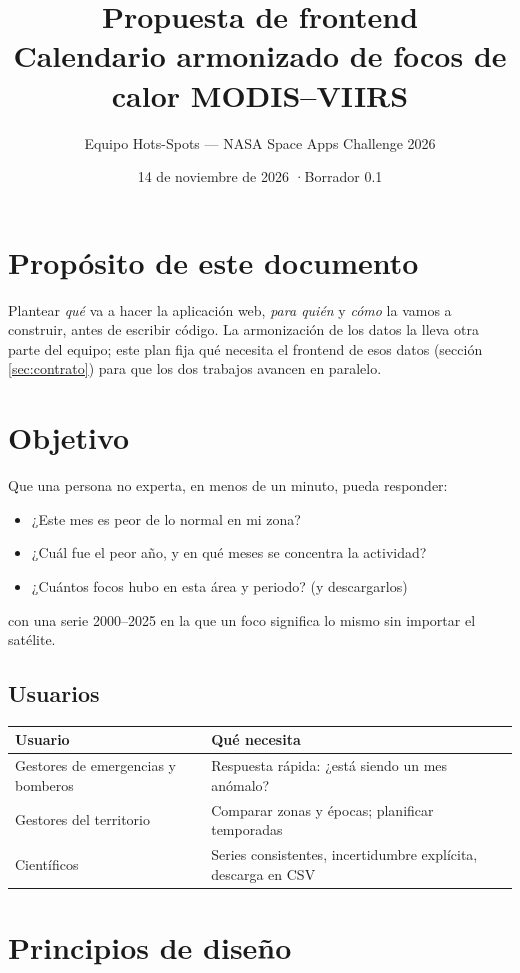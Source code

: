 \documentclass[11pt,a4paper]{article}
\title{Propuesta de frontend\\[0.3em]
  \large Calendario armonizado de focos de calor MODIS--VIIRS}
\author{Equipo Hots-Spots --- NASA Space Apps Challenge 2026}
\date{14 de noviembre de 2026 \quad·\quad Borrador 0.1}
\begin{document}
\maketitle

\section{Propósito de este documento}

Plantear \emph{qué} va a hacer la aplicación web, \emph{para quién} y \emph{cómo} la
vamos a construir, antes de escribir código. La armonización de los datos la lleva
otra parte del equipo; este plan fija qué necesita el frontend de esos datos (sección
\ref{sec:contrato}) para que los dos trabajos avancen en paralelo.

\section{Objetivo}

Que una persona no experta, en menos de un minuto, pueda responder:
\begin{itemize}
  \item ¿Este mes es peor de lo normal en mi zona?
  \item ¿Cuál fue el peor año, y en qué meses se concentra la actividad?
  \item ¿Cuántos focos hubo en esta área y periodo? (y descargarlos)
\end{itemize}
con una serie 2000--2025 en la que un foco significa lo mismo sin importar el satélite.

\subsection*{Usuarios}

\begin{tabularx}{\linewidth}{@{}lX@{}}
\toprule
Usuario & Qué necesita \\
\midrule
Gestores de emergencias y bomberos & Respuesta rápida: ¿está siendo un mes anómalo? \\
Gestores del territorio & Comparar zonas y épocas; planificar temporadas \\
Científicos & Series consistentes, incertidumbre explícita, descarga en CSV \\
\bottomrule
\end{tabularx}

\section{Principios de diseño}
\end{document}
